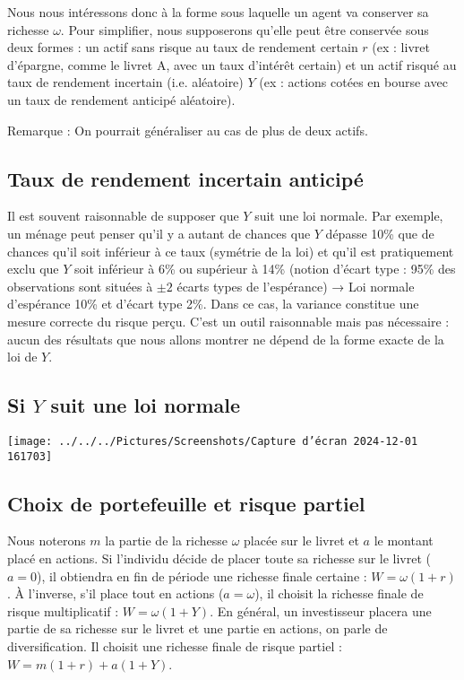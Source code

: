 \documentclass[a4paper, 12pt]{report}
\begin{document}
Nous nous intéressons donc à la forme sous laquelle un agent va conserver sa richesse \( \omega \). Pour simplifier, nous supposerons qu'elle peut être conservée sous deux formes : un actif sans risque au taux de rendement certain \( r \) (ex : livret d'épargne, comme le livret A, avec un taux d'intérêt certain) et un actif risqué au taux de rendement incertain (i.e. aléatoire) \( Y \) (ex : actions cotées en bourse avec un taux de rendement anticipé aléatoire). 

Remarque : On pourrait généraliser au cas de plus de deux actifs.

\subsection{Taux de rendement incertain anticipé}

Il est souvent raisonnable de supposer que \( Y \) suit une loi normale. Par exemple, un ménage peut penser qu'il y a autant de chances que \( Y \) dépasse 10\% que de chances qu'il soit inférieur à ce taux (symétrie de la loi) et qu'il est pratiquement exclu que \( Y \) soit inférieur à 6\% ou supérieur à 14\% (notion d'écart type : 95\% des observations sont situées à \(\pm 2\) écarts types de l'espérance) → Loi normale d'espérance 10\% et d'écart type 2\%. Dans ce cas, la variance constitue une mesure correcte du risque perçu. C'est un outil raisonnable mais pas nécessaire : aucun des résultats que nous allons montrer ne dépend de la forme exacte de la loi de \( Y \).

\subsection{Si \( Y \) suit une loi normale}
\begin{center}
\texttt{[image: ../../../Pictures/Screenshots/Capture d'écran 2024-12-01 161703]}
\end{center}

\subsection{Choix de portefeuille et risque partiel}

Nous noterons \( m \) la partie de la richesse \( \omega \) placée sur le livret et \( a \) le montant placé en actions. Si l'individu décide de placer toute sa richesse sur le livret (\( a = 0 \)), il obtiendra en fin de période une richesse finale certaine : \( W = \omega (1 + r) \). À l'inverse, s'il place tout en actions (\( a = \omega \)), il choisit la richesse finale de risque multiplicatif : \( W = \omega (1 + Y) \). En général, un investisseur placera une partie de sa richesse sur le livret et une partie en actions, on parle de diversification. Il choisit une richesse finale de risque partiel : \( W = m (1 + r) + a (1 + Y) \).
\end{document}
